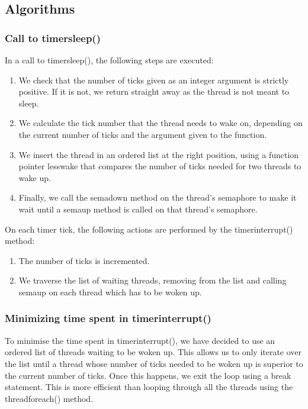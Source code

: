 \documentclass{article}
\renewcommand{\_}{\char`_}
\begin{document}
\subsection{Algorithms}
\subsubsection{Call to timer\textunderscore sleep()}

In a call to timer\textunderscore sleep(), the following steps are executed:

\begin{enumerate}
    \item We check that the number of ticks given as an integer argument is strictly positive. If it is not, we return straight away as the thread is not meant to sleep.
    \item We calculate the tick number that the thread needs to wake on, depending on the current number of ticks and the argument given to the function.
    \item We insert the thread in an ordered list at the right position, using a function pointer less\textunderscore wake that compares the number of ticks needed for two threads to wake up.
    \item Finally, we call the sema\textunderscore down method on the thread's semaphore to make it wait until a sema\textunderscore up method is called on that thread's semaphore.
\end{enumerate}

On each timer tick, the following actions are performed by the timer\textunderscore interrupt() method:

\begin{enumerate}
    \item The number of ticks is incremented.
    \item We traverse the list of waiting threads, removing from the list and calling sema\textunderscore up on each thread which has to be woken up.
\end{enumerate}

\subsubsection{Minimizing time spent in timer\textunderscore interrupt()}

To minimise the time spent in timer\textunderscore interrupt(), we have decided to use an ordered list of threads waiting to be woken up. This allows us to only iterate over the list until a thread whose number of ticks needed to be woken up is superior to the current number of ticks. Once this happens, we exit the loop using a break statement. This is more efficient than looping through all the threads using the thread\textunderscore foreach() method.
\end{document}
